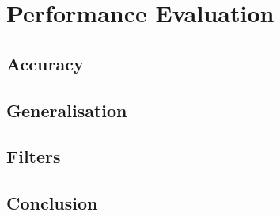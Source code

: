 \chapter{Performance Evaluation}%
\label{eval}

\section{Accuracy}

\section{Generalisation}

\section{Filters}

\section{Conclusion}
